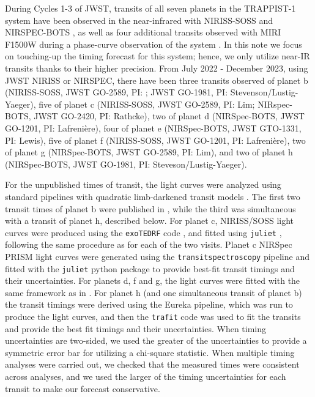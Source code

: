\documentclass[modern]{aastex631}
\begin{document}
During Cycles 1-3 of JWST, transits of all seven planets in the TRAPPIST-1 system \citep{Gillon2017} have been observed in
the near-infrared with NIRISS-SOSS \citep{Albert2023} and NIRSPEC-BOTS \citep{Jakobsen2022}, as well as four additional transits observed with MIRI F1500W during a phase-curve observation of the system \citep{Gillon2023}.  In this
note we focus on touching-up the timing forecast for this system; hence,
we only utilize near-IR transits thanks to their higher precision. %
From July 2022 - December 2023, using JWST NIRISS
or NIRSPEC, there have been three transits observed of planet b (NIRISS-SOSS, JWST GO-2589, PI: \citealt{Lim2023}; JWST GO-1981, PI: Stevenson/Lustig-Yaeger), 
five of planet c (NIRISS-SOSS, JWST GO-2589, PI: Lim; NIRspec-BOTS, JWST GO-2420, PI: Rathcke), two of planet d (NIRSpec-BOTS, JWST GO-1201, PI: Lafreni\`ere),
four of planet e (NIRSpec-BOTS, JWST GTO-1331, PI: Lewis), five of planet f (NIRISS-SOSS, JWST GO-1201, PI: Lafreni\`ere),
two of planet g (NIRSpec-BOTS, JWST GO-2589, PI: Lim), and two of planet h (NIRSpec-BOTS, JWST GO-1981, PI: Steveson/Lustig-Yaeger).
 
For the unpublished times of transit, the light curves were analyzed using standard pipelines with quadratic limb-darkened transit models \citep{Mandel2002}. %
The first two transit times of planet b were published in \citet{Lim2023}, while the third was simultaneous with a transit of planet h, described below.  For planet c, NIRISS/SOSS light curves were produced using the \texttt{exoTEDRF} code \citep{Feinstein2023, Radica2023, Radica2024exotedrf}, and fitted using \texttt{juliet} \citep{Espinoza2019}, following the same procedure as \citet{Radica2024} for each of the two visits. Planet c NIRSpec PRISM light curves were generated using the \texttt{transitspectroscopy} pipeline \citep{Espinoza_2022} and fitted with the \texttt{juliet} python package \citep{Espinoza2019} to provide best-fit transit timings and their uncertainties.
For planets d, f and g, the light curves were fitted with the same framework as in \citet{Lim2023}. For planet h (and one simultaneous transit of planet b) the transit timings were derived using %
the Eureka pipeline, which was run to produce the light curves, and then the \texttt{trafit} \citep{Gillon2010, Gillon2012} code was used to fit the transits and provide the best fit timings and their uncertainties.  When timing uncertainties are two-sided, we used the greater of the uncertainties to provide a symmetric
error bar for utilizing a chi-square statistic.  When multiple timing analyses were carried out, we checked that the measured times were consistent across analyses, and we used the larger of the timing uncertainties for each transit to make our forecast conservative.
\end{document}
